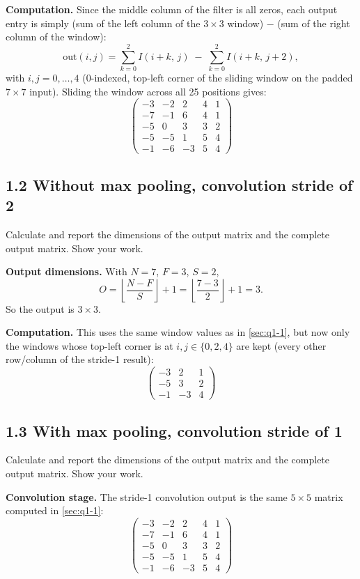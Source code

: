 \documentclass[10pt]{article}
\begin{document}
\textbf{Computation.} Since the middle column of the filter is all zeros, each output entry is
simply (sum of the left column of the $3\times3$ window) $-$ (sum of the right column of the
window):
\[
\text{out}(i,j) = \sum_{k=0}^{2} I(i+k,\,j) \;-\; \sum_{k=0}^{2} I(i+k,\,j+2),
\]
with $i,j = 0,\dots,4$ (0-indexed, top-left corner of the sliding window on the padded $7\times7$
input). Sliding the window across all 25 positions gives:
\[
\begin{pmatrix}
-3 & -2 &  2 &  4 &  1 \\
-7 & -1 &  6 &  4 &  1 \\
-5 &  0 &  3 &  3 &  2 \\
-5 & -5 &  1 &  5 &  4 \\
-1 & -6 & -3 &  5 &  4
\end{pmatrix}
\]

\subsection{1.2 Without max pooling, convolution stride of 2}
\label{sec:q1-2}
\begin{question}
Calculate and report the dimensions of the output matrix and the complete output matrix. Show
your work.
\end{question}

\textbf{Output dimensions.} With $N=7$, $F=3$, $S=2$,
\[
O = \left\lfloor\frac{N-F}{S}\right\rfloor+1 = \left\lfloor\frac{7-3}{2}\right\rfloor+1 = 3.
\]
So the output is $3\times3$.

\textbf{Computation.} This uses the same window values as in \ref{sec:q1-1}, but now only the
windows whose top-left corner is at $i,j \in \{0,2,4\}$ are kept (every other row/column of the
stride-1 result):
\[
\begin{pmatrix}
-3 &  2 &  1 \\
-5 &  3 &  2 \\
-1 & -3 &  4
\end{pmatrix}
\]

\subsection{1.3 With max pooling, convolution stride of 1}
\label{sec:q1-3}
\begin{question}
Calculate and report the dimensions of the output matrix and the complete output matrix. Show
your work.
\end{question}

\textbf{Convolution stage.} The stride-1 convolution output is the same $5\times5$ matrix computed
in \ref{sec:q1-1}:
\[
\begin{pmatrix}
-3 & -2 &  2 &  4 &  1 \\
-7 & -1 &  6 &  4 &  1 \\
-5 &  0 &  3 &  3 &  2 \\
-5 & -5 &  1 &  5 &  4 \\
-1 & -6 & -3 &  5 &  4
\end{pmatrix}
\]
\end{document}
